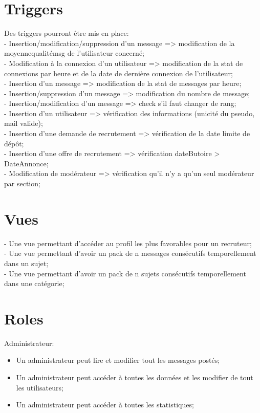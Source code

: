 \documentclass{report}
\begin{document}
\section{Triggers}
Des triggers pourront être mis en place:\\
 - Insertion/modification/suppression d'un message => modification de la moyennequalitémsg de l'utilisateur concerné;\\
 - Modification à la connexion d'un utilisateur => modification de la stat de connexions par heure et de la date de dernière connexion de l'utilisateur;\\
 - Insertion d'un message => modification de la stat de messages par heure;\\
 - Insertion/suppression d'un message => modification du nombre de message;\\
 - Insertion/modification d'un message => check s'il faut changer de rang;\\
 - Insertion d'un utilisateur => vérification des informations (unicité du pseudo, mail valide);\\
 - Insertion d'une demande de recrutement => vérification de la date limite de dépôt;\\
 - Insertion d'une offre de recrutement => vérification dateButoire > DateAnnonce;\\
 - Modification de modérateur => vérification qu'il n'y a qu'un seul modérateur par section;\\
\section{Vues}
 - Une vue permettant d'accéder au profil les plus favorables pour un recruteur;\\
 - Une vue permettant d'avoir un pack de n messages consécutifs temporellement dans un sujet;\\
 - Une vue permettant d'avoir un pack de n sujets consécutifs temporellement dans une catégorie;
\pagebreak
\section{Roles}
Administrateur:
\begin{itemize}
	\item Un administrateur peut lire et modifier tout les messages postés;
	\item Un administrateur peut accéder à toutes les données et  les modifier de tout les utilisateurs;
	\item Un administrateur peut accéder à toutes les statistiques;\\
\end{itemize}
\end{document}
